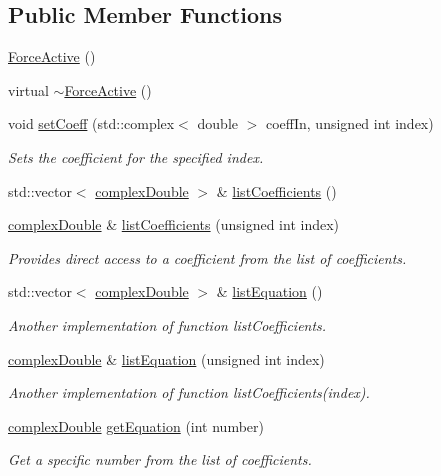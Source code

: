 \subsection*{Public Member Functions}
\begin{DoxyCompactItemize}
\item 
\hyperlink{classosea_1_1ofreq_1_1_force_active_ae006e3394f8c925c6a3218686c5cc8ae}{Force\-Active} ()
\item 
virtual \hyperlink{classosea_1_1ofreq_1_1_force_active_aa2db4bc1fb74ecb6e0ee46c59a40dd2a}{$\sim$\-Force\-Active} ()
\item 
void \hyperlink{classosea_1_1ofreq_1_1_force_active_a5b3f88bb50924c41766a234dd3fb988e}{set\-Coeff} (std\-::complex$<$ double $>$ coeff\-In, unsigned int index)
\begin{DoxyCompactList}\small\item\em Sets the coefficient for the specified index. \end{DoxyCompactList}\item 
std\-::vector$<$ \hyperlink{namespaceosea_1_1ofreq_a40cad4695a41123a7ae6ab0b6e8b1664}{complex\-Double} $>$ \& \hyperlink{classosea_1_1ofreq_1_1_force_active_a752a48e1f4dfc483a1cdb18754f8e630}{list\-Coefficients} ()
\item 
\hyperlink{namespaceosea_1_1ofreq_a40cad4695a41123a7ae6ab0b6e8b1664}{complex\-Double} \& \hyperlink{classosea_1_1ofreq_1_1_force_active_af96d4a0a2f0aa28911d8798f62d3b8bd}{list\-Coefficients} (unsigned int index)
\begin{DoxyCompactList}\small\item\em Provides direct access to a coefficient from the list of coefficients. \end{DoxyCompactList}\item 
std\-::vector$<$ \hyperlink{namespaceosea_1_1ofreq_a40cad4695a41123a7ae6ab0b6e8b1664}{complex\-Double} $>$ \& \hyperlink{classosea_1_1ofreq_1_1_force_active_a931628f3a5c5d9b142726697a96e1407}{list\-Equation} ()
\begin{DoxyCompactList}\small\item\em Another implementation of function list\-Coefficients. \end{DoxyCompactList}\item 
\hyperlink{namespaceosea_1_1ofreq_a40cad4695a41123a7ae6ab0b6e8b1664}{complex\-Double} \& \hyperlink{classosea_1_1ofreq_1_1_force_active_a573a98979938dd6bfbaf5d40ae17a058}{list\-Equation} (unsigned int index)
\begin{DoxyCompactList}\small\item\em Another implementation of function list\-Coefficients(index). \end{DoxyCompactList}\item 
\hyperlink{namespaceosea_1_1ofreq_a40cad4695a41123a7ae6ab0b6e8b1664}{complex\-Double} \hyperlink{classosea_1_1ofreq_1_1_force_active_a2e01f54c3071d2f8831fb7763cf14500}{get\-Equation} (int number)
\begin{DoxyCompactList}\small\item\em Get a specific number from the list of coefficients. \end{DoxyCompactList}\end{DoxyCompactItemize}
